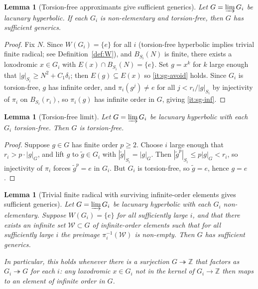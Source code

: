 \documentclass[12pt]{amsart}
\theoremstyle{plain}
\newtheorem{lemma}[theorem]{Lemma}
\theoremstyle{definition}
\begin{document}
\begin{lemma}[Torsion-free approximants give sufficient generics]\label{lem:tf-sg}
Let $G = \varinjlim G_i$ be lacunary hyperbolic. If each $G_i$ is non-elementary
and torsion-free, then $G$ has sufficient generics.
\end{lemma}

\begin{proof}
Fix $N$. Since $W(G_i) = \{e\}$ for all $i$ (torsion-free hyperbolic implies trivial
finite radical; see Definition~\ref{def:W}), and $B_{S_i}(N)$ is finite, there exists a loxodromic
$x \in G_i$ with $E(x) \cap B_{S_i}(N) = \{e\}$.
Set $g = x^k$ for $k$ large enough that $|g|_{S_i} \geq N^2 + C_1\delta_i$;
then $E(g) \subseteq E(x)$ so \ref{it:sg-avoid} holds.
Since $G_i$ is torsion-free, $g$ has infinite order, and
$\pi_i(g^j) \neq e$ for all $j < r_i / |g|_{S_i}$ by injectivity of $\pi_i$ on
$B_{S_i}(r_i)$, so $\pi_i(g)$ has infinite order in $G$, giving \ref{it:sg-inf}.
\end{proof}

\begin{lemma}[Torsion-free limit]\label{lem:tf-limit}
Let $G = \varinjlim G_i$ be lacunary hyperbolic with each $G_i$ torsion-free.
Then $G$ is torsion-free.
\end{lemma}

\begin{proof}
Suppose $g \in G$ has finite order $p \geq 2$.
Choose $i$ large enough that $r_i > p \cdot |g|_G$, and lift $g$ to $\tilde{g} \in G_i$
with $|\tilde{g}|_{S_i} = |g|_G$.
Then $|\tilde{g}^p|_{S_i} \leq p|g|_G < r_i$, so injectivity of $\pi_i$ forces
$\tilde{g}^p = e$ in $G_i$. But $G_i$ is torsion-free, so $\tilde{g} = e$, hence $g = e$.
\end{proof}


\begin{lemma}[Trivial finite radical with surviving infinite-order elements gives sufficient generics]\label{lem:wg-sg}
Let $G = \varinjlim G_i$ be lacunary hyperbolic with each $G_i$ non-elementary.
Suppose $W(G_i) = \{e\}$ for all sufficiently large $i$, and that there exists an
infinite set $\mathcal{W} \subset G$ of infinite-order elements such that for all
sufficiently large $i$ the preimage $\pi_i^{-1}(\mathcal{W})$ is non-empty.
Then $G$ has sufficient generics.

In particular, this holds whenever there is a surjection $G \twoheadrightarrow \mathbb{Z}$
that factors as $G_i \twoheadrightarrow G$ for each $i$: any loxodromic $x \in G_i$ not
in the kernel of $G_i \to \mathbb{Z}$ then maps to an element of infinite order in $G$.
\end{lemma}
\end{document}
